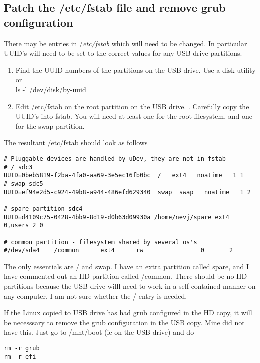 \documentclass{article}  %
\begin{document}
\subsection{Patch the /etc/fstab file and remove grub configuration}
There may be entries in {/\em etc/fstab} which will need to be changed. In particular UUID's will need to be set to the correct values for any USB drive partitions. 
\begin{enumerate}
\item Find the UUID numbers of the partitions on the USB drive. Use a disk utility or \\
  ls -l /dev/disk/by-uuid
\item Edit /etc/fstab on the root partition on the USB drive. . Carefully copy the UUID's into fstab. You will need at least one for the root filesystem, and one for the swap partition.
\end{enumerate}
 The resultant /etc/fstab should look as follows
\begin{verbatim}
# Pluggable devices are handled by uDev, they are not in fstab
# / sdc3
UUID=0beb5819-f2ba-4fa0-aa69-3e5ec16fb0bc  /   ext4   noatime   1 1 
# swap sdc5
UUID=ef94e2d5-c924-49b8-a944-486efd629340  swap  swap   noatime   1 2 

# spare partition sdc4
UUID=d4109c75-0428-4bb9-8d19-d0b63d09930a /home/nevj/spare ext4 0,users 2 0 

# common partition - filesystem shared by several os's
#/dev/sda4    /common      ext4      rw                0       2
\end{verbatim}
The only essentials are / and swap. I have an extra partition called spare, and I have commented out an HD partition called /common. There should be no HD partitions because the USB drive willl need to work in a self contained manner on any computer. I am not sure whether the / entry is needed.

If the Linux copied to USB drive has had grub configured in the HD copy, it will be necesssary to remove the grub configuration in the USB copy. Mine did not have this. Just go to /mnt/boot (ie on the USB drive) and do 
\begin{verbatim}
rm -r grub
rm -r efi
\end{verbatim}
\end{document}
